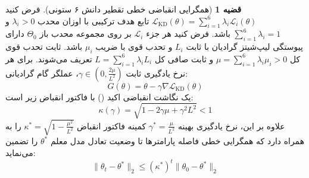 \documentclass[12pt,a4paper]{report}
\theoremstyle{definition}
\newtheorem{theorem}{قضیه}[chapter]
\begin{document}
\begin{theorem}[همگرایی انقباضی خطی تقطیر دانش ۶ ستونی]
\label{thm:kd_contraction_persian}
فرض کنید $\mathcal{L}_{\text{KD}}(\theta) = \sum_{i=1}^6 \lambda_i \mathcal{L}_i(\theta)$ تابع هدف ترکیبی با اوزان محدب $\lambda_i > 0$ و $\sum_{i=1}^6 \lambda_i = 1$ باشد. فرض کنید هر جزء $\mathcal{L}_i$ بر روی مجموعه محدب باز $\Theta_0$ دارای پیوستگی لیپ‌شیتز گرادیان با ثابت $L_i$ و تحدب قوی با ضریب $\mu_i$ باشد.
ثابت تحدب قوی کل $\mu = \sum_{i=1}^6 \lambda_i \mu_i > 0$ و ثابت صافی کل $L = \sum_{i=1}^6 \lambda_i L_i$ تعریف می‌شوند.
برای هر نرخ یادگیری ثابت $\gamma \in \left(0, \frac{2\mu}{L^2}\right)$، عملگر گام گرادیانی:
\begin{equation}
    G(\theta) = \theta - \gamma \nabla \mathcal{L}_{\text{KD}}(\theta)
\end{equation}
یک نگاشت انقباضی اکید () با فاکتور انقباض زیر است:
\begin{equation}
    \kappa(\gamma) = \sqrt{1 - 2 \gamma \mu + \gamma^2 L^2} < 1
\end{equation}
علاوه بر این، نرخ یادگیری بهینه $\gamma^* = \frac{\mu}{L^2}$ کمینه فاکتور انقباض $\kappa^* = \sqrt{1 - \frac{\mu^2}{L^2}}$ را به همراه دارد که همگرایی خطی فاصله پارامترها تا وضعیت تعادل مدل معلم $\theta^*$ را تضمین می‌نماید:
\begin{equation}
    \|\theta_t - \theta^*\|_2 \le (\kappa^*)^t \|\theta_0 - \theta^*\|_2
\end{equation}
\end{theorem}
\end{document}
